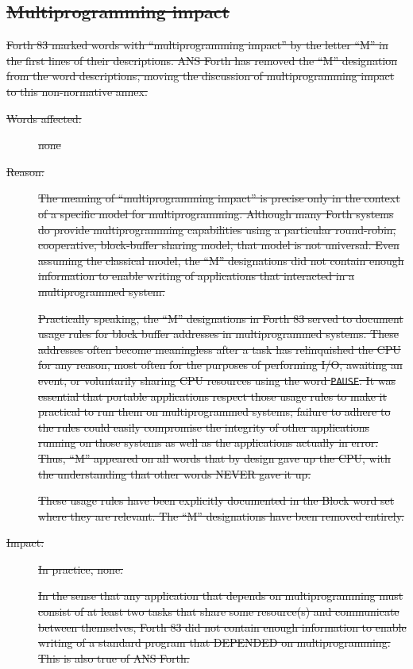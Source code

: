 \subsection[Multiprogramming impact]{\sout{Multiprogramming impact}} %
\label{diff:multitasking}

\sout{%
Forth 83 marked words with ``multiprogramming impact'' by the letter
``M'' in the first lines of their descriptions. ANS Forth has removed
the ``M'' designation from the word descriptions, moving the dis\-cus\-sion
of multiprogramming impact to this non-normative annex.}

\begin{description}
\item[\sout{Words affected:}]
\sout{none}

\item[\sout{Reason:}]
\sout{%
	The meaning of ``multiprogramming impact'' is precise only in the
	context of a specific model for multiprogramming. Although many
	Forth systems do provide multiprogramming capabilities using a
	particular round-robin, cooperative, block-buffer sharing model,
	that model is not universal. Even assuming the classical model,
	the ``M'' designations did not contain enough information to
	enable writing of applications that interacted in a multiprogrammed
	system.}

\sout{%
	Practically speaking, the ``M'' designations in Forth 83 served
	to document usage rules for block buffer addresses in multiprogrammed
	systems. These addresses often become meaningless after a task
	has relinquished the CPU for any reason, most often for the
	purposes of performing I/O, awaiting an event, or voluntarily
	sharing CPU resources using the word \texttt{PAUSE}. It was
	essential that portable applications respect those usage rules to
	make it practical to run them on multiprogrammed systems; failure
	to adhere to the rules could easily compromise the integrity of
	other applications running on those systems as well as the
	applications actually in error. Thus, ``M'' appeared on all words
	that by design gave up the CPU, with the understanding that other
	words NEVER gave it up.}

\sout{%
	These usage rules have been explicitly documented in the Block
	word set where they are relevant. The ``M'' designations have
	been removed entirely.}

\item[\sout{Impact:}]
\sout{In practice, none.}

\sout{%
	In the sense that any application that depends on multiprogramming
	must consist of at least two tasks that share some resource(s) and
	communicate between themselves, Forth 83 did not contain enough
	information to enable writing of a standard program that DEPENDED
	on multiprogramming. This is also true of ANS Forth.}


\end{description}
